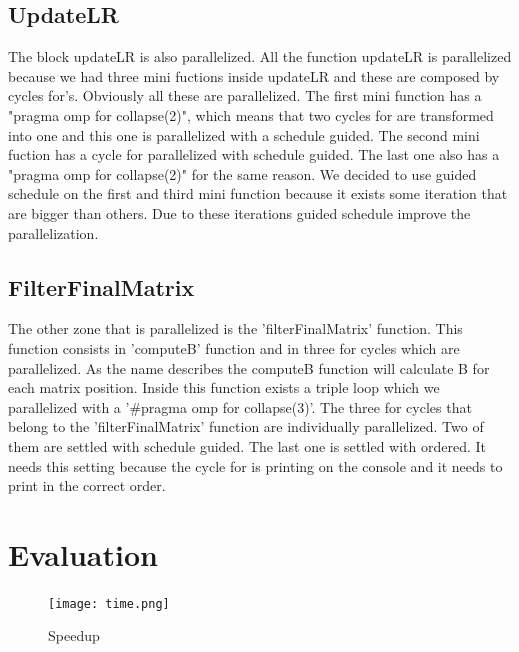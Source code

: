 \documentclass[twocolumn]{article}
\begin{document}
    \subsection{UpdateLR}\label{subsec:updatelr2}
    The block updateLR is also parallelized.
    All the function updateLR is parallelized because we had three mini fuctions inside updateLR and these are composed by cycles for's.
    Obviously all these are parallelized.
    The first mini function has a "pragma omp for collapse(2)", which means that two cycles for are transformed into one and this one is parallelized with a schedule guided.
    The second mini fuction has a cycle for parallelized with schedule guided.
    The last one also has a "pragma omp for collapse(2)" for the same reason.
    We decided to use guided schedule on the first and third mini function because it exists some iteration that are bigger than others.
    Due to these iterations guided schedule improve the parallelization.

    \subsection{FilterFinalMatrix}\label{subsec:filterfinalmatrix}
    The other zone that is parallelized is the 'filterFinalMatrix' function.
    This function consists in 'computeB' function and in three for cycles which are parallelized.
    As the name describes the computeB function will calculate B for each matrix position.
    Inside this function exists a triple loop which we parallelized with a '#pragma omp for collapse(3)'. The three for cycles that belong to the 'filterFinalMatrix' function are individually parallelized.
    Two of them are settled with schedule guided.
    The last one is settled with ordered.
    It needs this setting because the cycle for is printing on the console and it needs to print in the correct order.

    \section{Evaluation}\label{sec:evaluation}

    \begin{figure}[h]
        \caption{Speedup}
        \texttt{[image: time.png]}
        \label{fig:Ng2}
    \end{figure}
\end{document}

